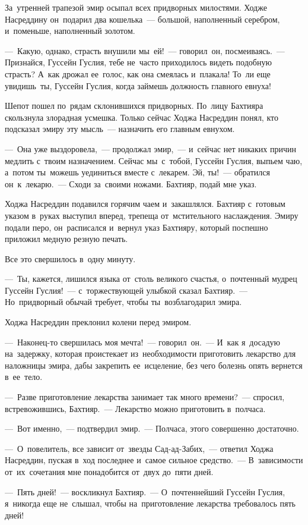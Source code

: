 \documentclass[12pt,a4paper]{book}
\begin{document}
За~утренней трапезой эмир осыпал всех придворных милостями. Ходже Насреддину он~подарил два кошелька~— большой, наполненный серебром, и~поменьше, наполненный золотом.

—~Какую, однако, страсть внушили мы~ей!~— говорил~он, посмеиваясь.~— Признайся, Гуссейн Гуслия, тебе не~часто приходилось видеть подобную страсть? А~как дрожал ее~голос, как она смеялась и~плакала! То~ли еще увидишь~ты, Гуссейн Гуслия, когда займешь должность главного евнуха!

Шепот пошел по~рядам склонившихся придворных. По~лицу Бахтияра скользнула злорадная усмешка. Только сейчас Ходжа Насреддин понял, кто подсказал эмиру эту мысль~— назначить его главным евнухом.

—~Она уже выздоровела,~— продолжал эмир,~— и~сейчас нет никаких причин медлить с~твоим назначением. Сейчас мы~с~тобой, Гуссейн Гуслия, выпьем чаю, а~потом ты~можешь уединиться вместе с~лекарем. Эй, ты!~— обратился он~к~лекарю.~— Сходи за~своими ножами. Бахтияр, подай мне указ.

Ходжа Насреддин подавился горячим чаем и~закашлялся. Бахтияр с~готовым указом в~руках выступил вперед, трепеща от~мстительного наслаждения. Эмиру подали перо, он~расписался и~вернул указ Бахтияру, который поспешно приложил медную резную печать.

Все это свершилось в~одну минуту.

—~Ты, кажется, лишился языка от~столь великого счастья, о~почтенный мудрец Гуссейн Гуслия!~— с~торжествующей улыбкой сказал Бахтияр.~— Но~придворный обычай требует, чтобы ты~возблагодарил эмира.

Ходжа Насреддин преклонил колени перед эмиром.

—~Наконец-то свершилась моя мечта!~— говорил~он.~— И~как я~досадую на~задержку, которая проистекает из~необходимости приготовить лекарство для наложницы эмира, дабы закрепить ее~исцеление, без чего болезнь опять вернется в~ее~тело.

—~Разве приготовление лекарства занимает так много времени?~— спросил, встревожившись, Бахтияр.~— Лекарство можно приготовить в~полчаса.

—~Вот именно,~— подтвердил эмир.~— Полчаса, этого совершенно достаточно.

—~О~повелитель, все зависит от~звезды Сад-ад-Забих,~— ответил Ходжа Насреддин, пуская в~ход последнее и~самое сильное средство.~— В~зависимости от~их~сочетания мне понадобится от~двух до~пяти дней.

—~Пять дней!~— воскликнул Бахтияр.~— О~почтеннейший Гуссейн Гуслия, я~никогда еще не~слышал, чтобы на~приготовление лекарства требовалось пять дней!
\end{document}
